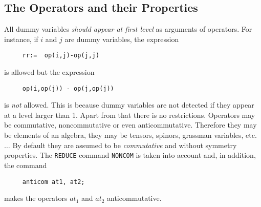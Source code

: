\subsection{The Operators and their Properties}
All dummy variables {\em should appear at first level}
as  arguments of operators. For instance, if $i$ and $j$ are 
dummy variables, the expression 
\begin{verbatim}
     rr:=  op(i,j)-op(j,j)
\end{verbatim}
is allowed but the expression 
\begin{verbatim}
     op(i,op(j)) - op(j,op(j))
\end{verbatim}
is {\em not} allowed. This is because dummy variables are not detected 
if they appear at a level larger than 1. 
Apart from that there is no restrictions. Operators  may be 
commutative, noncommutative or even anticommutative. Therefore 
they may be elements of an algebra, they may be tensors,
spinors, grassman variables, etc. $\ldots$
By default they are assumed to be {\em commutative} and without symmetry
properties. The {\tt REDUCE} command {\tt NONCOM} is taken into account 
and, in addition, the command
\begin{verbatim}
     anticom at1, at2;
\end{verbatim}
makes the operators $at_1$ and $at_2$ anticommutative.


